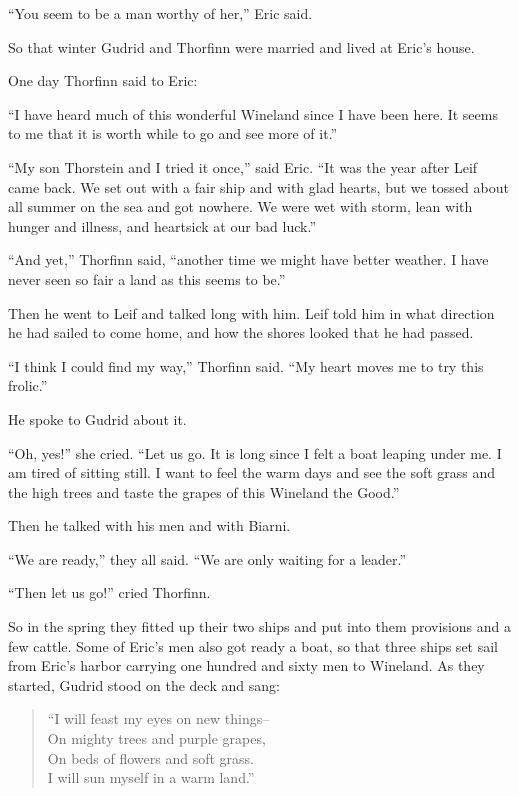 ``You seem to be a man worthy of her,'' Eric said.

So that winter Gudrid and Thorfinn were married and lived at Eric's
house.

One day Thorfinn said to Eric:

``I have heard much of this wonderful Wineland since I have been here.
It seems to me that it is worth while to go and see more of it.''

``My son Thorstein and I tried it once,'' said Eric. ``It was the year
after Leif came back. We set out with a fair ship and with glad hearts,
but we tossed about all summer on the sea and got nowhere. We were wet
with storm, lean with hunger and illness, and heartsick at our bad
luck.''

``And yet,'' Thorfinn said, ``another time we might have better weather.
I have never seen so fair a land as this seems to be.''

Then he went to Leif and talked long with him. Leif told him in what
direction he had sailed to come home, and how the shores looked that he
had passed.

``I think I could find my way,'' Thorfinn said. ``My heart moves me to
try this frolic.''

He spoke to Gudrid about it.

``Oh, yes!'' she cried. ``Let us go. It is long since I felt a boat
leaping under me. I am tired of sitting still. I want to feel the warm
days and see the soft grass and the high trees and taste the grapes of
this Wineland the Good.''

Then he talked with his men and with Biarni.

``We are ready,'' they all said. ``We are only waiting for a leader.''

``Then let us go!'' cried Thorfinn.

So in the spring they fitted up their two ships and put into them
provisions and a few cattle. Some of Eric's men also got ready a boat,
so that three ships set sail from Eric's harbor carrying one hundred and
sixty men to Wineland. As they started, Gudrid stood on the deck and
sang:

\begin{quote}
``I will feast my eyes on new things--\\
On mighty trees and purple grapes,\\
On beds of flowers and soft grass.\\
I will sun myself in a warm land.''
\end{quote}

